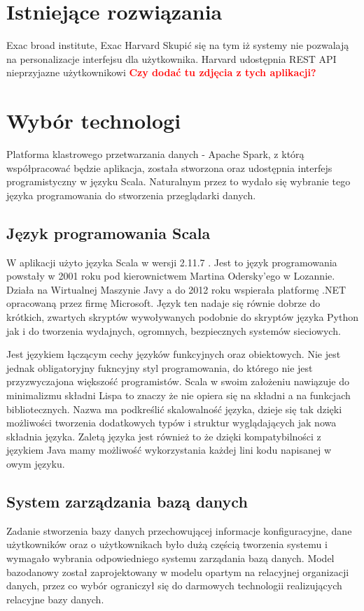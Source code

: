 \documentclass[a4paper,12pt,twoside]{article}
\begin{document}
\section{Istniejące rozwiązania}  

Exac broad institute, Exac Harvard  
Skupić się na tym iż systemy nie pozwalają na personalizacje interfejsu dla użytkownika.
Harvard udostępnia REST API nieprzyjazne użytkownikowi \newline
\textcolor{red}{\textbf{Czy dodać tu zdjęcia z tych aplikacji?}}

\newpage
\section{Wybór technologi}

Platforma klastrowego przetwarzania danych - Apache Spark\cite{spark}, z którą współpracować będzie aplikacja, została stworzona oraz udostępnia interfejs programistyczny w języku Scala.
Naturalnym przez to wydało się wybranie tego języka programowania do stworzenia przeglądarki danych.

  
\subsection{Język programowania Scala}
W aplikacji użyto języka Scala w wersji 2.11.7 \cite{jezykScala}. Jest to język programowania powstały w 2001 roku pod kierownictwem Martina Odersky'ego w Lozannie.
Działa na Wirtualnej Maszynie Javy a do 2012 roku wspierała platformę .NET opracowaną przez firmę Microsoft. Język ten nadaje się równie dobrze do krótkich, zwartych skryptów  wywoływanych podobnie do skryptów języka Python jak i do tworzenia wydajnych, ogromnych, bezpiecznych systemów sieciowych.

Jest językiem łączącym cechy języków funkcyjnych oraz obiektowych. 
Nie jest jednak obligatoryjny fukncyjny styl programowania, do którego nie jest przyzwyczajona większość programistów.
 Scala w swoim założeniu nawiązuje do minimalizmu składni Lispa to znaczy że nie opiera się na składni a na funkcjach bibliotecznych. Nazwa ma podkreślić skalowalność języka, dzieje się tak dzięki możliwości tworzenia dodatkowych typów i struktur wyglądających jak nowa składnia języka.
Zaletą języka jest również to że dzięki kompatybilności z językiem Java mamy możliwość wykorzystania każdej lini kodu napisanej w owym języku.

\subsection{System zarządzania bazą danych}  
Zadanie stworzenia bazy danych przechowującej informacje konfiguracyjne, dane użytkowników oraz o użytkownikach było 
dużą częścią tworzenia systemu i
wymagało wybrania odpowiedniego systemu zarządania bazą danych.
Model bazodanowy został zaprojektowany w modelu opartym na relacyjnej organizacji danych, przez co wybór ograniczył się do
darmowych technologii realizujących relacyjne bazy danych.
\end{document}
